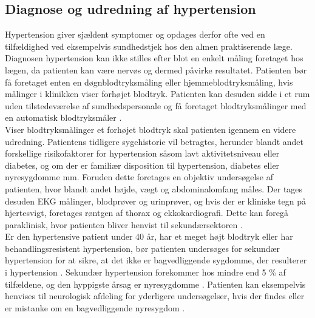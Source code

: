 \subsection{Diagnose og udredning af hypertension}
Hypertension giver sjældent symptomer og opdages derfor ofte ved en tilfældighed ved eksempelvis sundhedstjek hos den almen praktiserende læge. Diagnosen hypertension kan ikke stilles efter blot en enkelt måling foretaget hos lægen, da patienten kan være nervøs og dermed påvirke resultatet. Patienten bør få foretaget enten en døgnblodtryksmåling eller hjemmeblodtryksmåling, hvis målinger i klinikken viser forhøjet blodtryk. Patienten kan desuden sidde i et rum uden tilstedeværelse af sundhedspersonale og få foretaget blodtryksmålinger med en automatisk blodtryksmåler \citep{lodberg2016, bech2015}. \\
Viser blodtryksmålinger et forhøjet blodtryk skal patienten igennem en videre udredning. Patientens tidligere sygehistorie vil betragtes, herunder blandt andet forskellige risikofaktorer for hypertension såsom lavt aktivitetsniveau eller diabetes, og om der er familiær disposition til hypertension, diabetes eller nyresygdomme mm. Foruden dette foretages en objektiv undersøgelse af patienten, hvor blandt andet højde, vægt og abdominalomfang måles. Der tages desuden EKG målinger, blodprøver og urinprøver, og hvis der er kliniske tegn på hjertesvigt, foretages røntgen af thorax og ekkokardiografi. Dette kan foregå paraklinisk, hvor patienten bliver henvist til sekundærsektoren \citep{lodberg2016, bech2015}. \\
Er den hypertensive patient under 40 år, har et meget højt blodtryk eller har behandlingsresistent hypertension, bør patienten undersøges for sekundær hypertension for at sikre, at det ikke er bagvedliggende sygdomme, der resulterer i hypertension \citep{lodberg2016}. Sekundær hypertension forekommer hos mindre end 5 \% af tilfældene, og den hyppigste årsag er nyresygdomme \citep{lodberg2008}. Patienten kan eksempelvis henvises til neurologisk afdeling for yderligere undersøgelser, hvis der findes eller er mistanke om en bagvedliggende nyresygdom \citep{lodberg2016, sundhedsstyrelsen2010}. 

